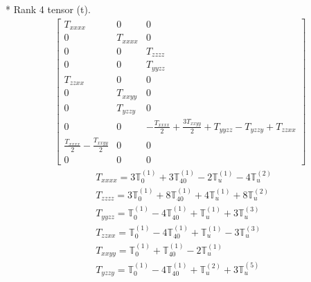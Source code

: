 \documentclass[fleqn,8pt,landscape]{jsarticle}
\begin{document}
* Rank 4 tensor (t).
\begin{align*}
\begin{bmatrix} T_{xxxx} & 0 & 0 \\ 0 & T_{xxxx} & 0 \\ 0 & 0 & T_{zzzz} \\ 0 & 0 & T_{yyzz} \\ T_{zzxx} & 0 & 0 \\ 0 & T_{xxyy} & 0 \\ 0 & T_{yzzy} & 0 \\ 0 & 0 & - \frac{T_{xxxx}}{2} + \frac{3 T_{xxyy}}{2} + T_{yyzz} - T_{yzzy} + T_{zzxx} \\ \frac{T_{xxxx}}{2} - \frac{T_{xxyy}}{2} & 0 & 0 \\ 0 & 0 & 0 \end{bmatrix}
\end{align*}
\begin{align*}
& T_{xxxx} = 3 \mathbb{T}_{0}^{(1)} + 3 \mathbb{T}_{40}^{(1)} - 2 \mathbb{T}_{u}^{(1)} - 4 \mathbb{T}_{u}^{(2)} \\
& T_{zzzz} = 3 \mathbb{T}_{0}^{(1)} + 8 \mathbb{T}_{40}^{(1)} + 4 \mathbb{T}_{u}^{(1)} + 8 \mathbb{T}_{u}^{(2)} \\
& T_{yyzz} = \mathbb{T}_{0}^{(1)} - 4 \mathbb{T}_{40}^{(1)} + \mathbb{T}_{u}^{(1)} + 3 \mathbb{T}_{u}^{(3)} \\
& T_{zzxx} = \mathbb{T}_{0}^{(1)} - 4 \mathbb{T}_{40}^{(1)} + \mathbb{T}_{u}^{(1)} - 3 \mathbb{T}_{u}^{(3)} \\
& T_{xxyy} = \mathbb{T}_{0}^{(1)} + \mathbb{T}_{40}^{(1)} - 2 \mathbb{T}_{u}^{(1)} \\
& T_{yzzy} = \mathbb{T}_{0}^{(1)} - 4 \mathbb{T}_{40}^{(1)} + \mathbb{T}_{u}^{(2)} + 3 \mathbb{T}_{u}^{(5)}
\end{align*}
\end{document}

